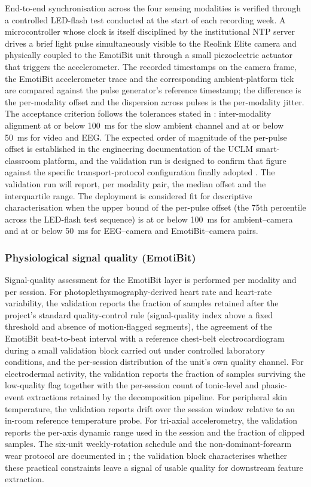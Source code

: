 End-to-end synchronisation across the four sensing modalities is verified through a controlled LED-flash test conducted at the start of each recording week. A microcontroller whose clock is itself disciplined by the institutional NTP server drives a brief light pulse simultaneously visible to the Reolink Elite camera and physically coupled to the EmotiBit unit through a small piezoelectric actuator that triggers the accelerometer. The recorded timestamps on the camera frame, the EmotiBit accelerometer trace and the corresponding ambient-platform tick are compared against the pulse generator's reference timestamp; the difference is the per-modality offset and the dispersion across pulses is the per-modality jitter. The acceptance criterion follows the tolerances stated in : inter-modality alignment at or below 100~ms for the slow ambient channel and at or below 50~ms for video and EEG. The expected order of magnitude of the per-pulse offset is established in the engineering documentation of the UCLM smart-classroom platform, and the validation run is designed to confirm that figure against the specific transport-protocol configuration finally adopted \parencite{Mishra2020_mqtt,Shi2016_edge}. The validation run will report, per modality pair, the median offset and the interquartile range. The deployment is considered fit for descriptive characterisation when the upper bound of the per-pulse offset (the 75th percentile across the LED-flash test sequence) is at or below 100~ms for ambient--camera and at or below 50~ms for EEG--camera and EmotiBit--camera pairs.

\subsubsection{Physiological signal quality (EmotiBit)}\label{subsec:val-emotibit}

Signal-quality assessment for the EmotiBit layer is performed per modality and per session. For photoplethysmography-derived heart rate and heart-rate variability, the validation reports the fraction of samples retained after the project's standard quality-control rule (signal-quality index above a fixed threshold and absence of motion-flagged segments), the agreement of the EmotiBit beat-to-beat interval with a reference chest-belt electrocardiogram during a small validation block carried out under controlled laboratory conditions, and the per-session distribution of the unit's own quality channel. For electrodermal activity, the validation reports the fraction of samples surviving the low-quality flag together with the per-session count of tonic-level and phasic-event extractions retained by the decomposition pipeline. For peripheral skin temperature, the validation reports drift over the session window relative to an in-room reference temperature probe. For tri-axial accelerometry, the validation reports the per-axis dynamic range used in the session and the fraction of clipped samples. The six-unit weekly-rotation schedule and the non-dominant-forearm wear protocol are documented in ; the validation block characterises whether these practical constraints leave a signal of usable quality for downstream feature extraction.

